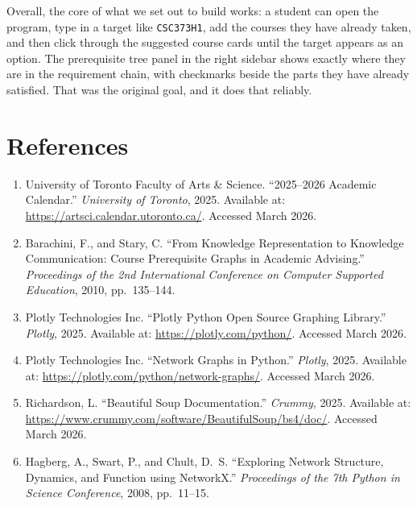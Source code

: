 \documentclass[11pt]{article}
\begin{document}
Overall, the core of what we set out to build works: a student can open the program, type in
a target like \verb|CSC373H1|, add the courses they have already taken, and then click
through the suggested course cards until the target appears as an option. The prerequisite
tree panel in the right sidebar shows exactly where they are in the requirement chain, with
checkmarks beside the parts they have already satisfied. That was the original goal, and it
does that reliably.

\section*{References}

\begin{enumerate}

    \item[{[1]}] University of Toronto Faculty of Arts \& Science. ``2025--2026 Academic
    Calendar.'' \textit{University of Toronto}, 2025.
    Available at: \url{https://artsci.calendar.utoronto.ca/}. Accessed March 2026.

    \item[{[2]}] Barachini, F., and Stary, C. ``From Knowledge Representation to Knowledge
    Communication: Course Prerequisite Graphs in Academic Advising.'' \textit{Proceedings of
    the 2nd International Conference on Computer Supported Education}, 2010, pp.\ 135--144.

    \item[{[3]}] Plotly Technologies Inc. ``Plotly Python Open Source Graphing Library.''
    \textit{Plotly}, 2025. Available at: \url{https://plotly.com/python/}. Accessed March
    2026.

    \item[{[3a]}] Plotly Technologies Inc. ``Network Graphs in Python.'' \textit{Plotly},
    2025. Available at: \url{https://plotly.com/python/network-graphs/}. Accessed March 2026.

    \item[{[4]}] Richardson, L. ``Beautiful Soup Documentation.'' \textit{Crummy}, 2025.
    Available at: \url{https://www.crummy.com/software/BeautifulSoup/bs4/doc/}. Accessed
    March 2026.

    \item[{[5]}] Hagberg, A., Swart, P., and Chult, D.\ S. ``Exploring Network Structure,
    Dynamics, and Function using NetworkX.'' \textit{Proceedings of the 7th Python in Science
    Conference}, 2008, pp.\ 11--15.

\end{enumerate}
\end{document}
